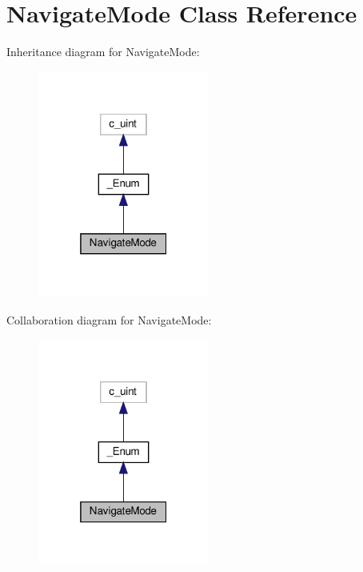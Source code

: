 \hypertarget{classvlc_1_1_navigate_mode}{}\section{Navigate\+Mode Class Reference}
\label{classvlc_1_1_navigate_mode}


Inheritance diagram for Navigate\+Mode\+:
\nopagebreak
\begin{figure}[H]
\begin{center}
\leavevmode
\includegraphics[width=160pt]{classvlc_1_1_navigate_mode__inherit__graph}
\end{center}
\end{figure}


Collaboration diagram for Navigate\+Mode\+:
\nopagebreak
\begin{figure}[H]
\begin{center}
\leavevmode
\includegraphics[width=160pt]{classvlc_1_1_navigate_mode__coll__graph}
\end{center}
\end{figure}
